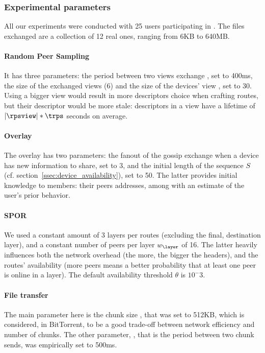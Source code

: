 \subsubsection{Experimental parameters} %
\label{ssub:experimental_parameters}

All our experiments were conducted with 25 users participating in \name. 
The files exchanged are a collection of 12 real ones, ranging from 6KB to 640MB.

\paragraph*{Random Peer Sampling} It has three parameters: the period between two views exchange \trps, set to 400ms, the size of the exchanged views (6) and the size of the devices' view \rpsview, set to 30. 
Using a bigger view would result in more descriptors choice when crafting routes, but their descriptor would be more stale: descriptors in a view have a lifetime of $|\rpsview| * \trps$ seconds on average.

\paragraph*{Overlay} The \squad overlay has two parameters: the fanout of the gossip exchange when a device has new information to share, set to 3, and the initial length of the sequence $S$ (cf. section~\ref{ssec:device_availability}), set to 50.
The latter provides initial knowledge to \squad members: their peers addresses, among with an estimate of the user's prior behavior.

\paragraph*{\ac{SPOR}} We used a constant amount of 3 layers per routes (excluding the final, destination layer),
and a constant number of peers per layer $w_\layer$ of 16.
The latter heavily influences both the network overhead (the more, the bigger the headers), and the routes' availability (more peers means a better probability that at least one peer is online in a layer).
The default availability threshold $\theta$ is $10^-3$.


\paragraph*{File transfer} The main parameter here is the chunk size \chunksize, that was set to 512KB, which is considered, in BitTorrent, to be a good trade-off between network efficiency and number of chunks.
The other parameter, \tupload, that is the period between two chunk sends, was empirically set to 500ms.


